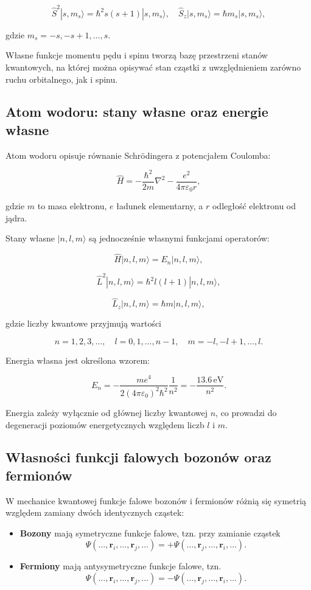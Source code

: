 \[
\hat{S}^2 |s, m_s\rangle = \hbar^2 s(s+1) |s, m_s\rangle, \quad \hat{S}_z |s, m_s\rangle = \hbar m_s |s, m_s\rangle,
\]

gdzie \(m_s = -s, -s+1, \ldots, s\).

Własne funkcje momentu pędu i spinu tworzą bazę przestrzeni stanów kwantowych, na której można opisywać stan cząstki z uwzględnieniem zarówno ruchu orbitalnego, jak i spinu.

\subsection{Atom wodoru: stany własne oraz energie własne}


Atom wodoru opisuje równanie Schrödingera z potencjałem Coulomba:

\[
\hat{H} = -\frac{\hbar^2}{2m} \nabla^2 - \frac{e^2}{4 \pi \varepsilon_0 r},
\]

gdzie \(m\) to masa elektronu, \(e\) ładunek elementarny, a \(r\) odległość elektronu od jądra.

Stany własne \(|n, l, m\rangle\) są jednocześnie własnymi funkcjami operatorów:

\[
\hat{H}|n, l, m\rangle = E_n |n, l, m\rangle,
\]

\[
\hat{L}^2 |n, l, m\rangle = \hbar^2 l(l+1) |n, l, m\rangle,
\]

\[
\hat{L}_z |n, l, m\rangle = \hbar m |n, l, m\rangle,
\]

gdzie liczby kwantowe przyjmują wartości

\[
n = 1, 2, 3, \ldots, \quad l = 0, 1, \ldots, n-1, \quad m = -l, -l+1, \ldots, l.
\]

Energia własna jest określona wzorem:

\[
E_n = - \frac{m e^4}{2 (4 \pi \varepsilon_0)^2 \hbar^2} \frac{1}{n^2} = - \frac{13.6\,\mathrm{eV}}{n^2}.
\]

Energia zależy wyłącznie od głównej liczby kwantowej \(n\), co prowadzi do degeneracji poziomów energetycznych względem liczb \(l\) i \(m\).

\subsection{Własności funkcji falowych bozonów oraz fermionów}


W mechanice kwantowej funkcje falowe bozonów i fermionów różnią się symetrią względem zamiany dwóch identycznych cząstek:

\begin{itemize}
    \item \textbf{Bozony} mają symetryczne funkcje falowe, tzn. przy zamianie cząstek
    \[
    \Psi(\ldots, \mathbf{r}_i, \ldots, \mathbf{r}_j, \ldots) = + \Psi(\ldots, \mathbf{r}_j, \ldots, \mathbf{r}_i, \ldots).
    \]
    
    \item \textbf{Fermiony} mają antysymetryczne funkcje falowe, tzn.
    \[
    \Psi(\ldots, \mathbf{r}_i, \ldots, \mathbf{r}_j, \ldots) = - \Psi(\ldots, \mathbf{r}_j, \ldots, \mathbf{r}_i, \ldots).
    \]
\end{itemize}

